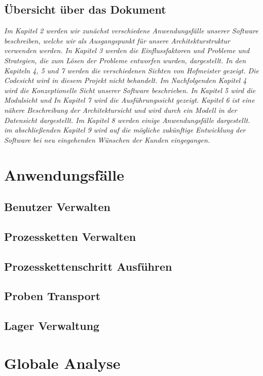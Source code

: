 \documentclass[enabledeprecatedfontcommands,fontsize=12pt,paper=a4,twoside]{scrartcl}
\begin{document}
\subsection{Übersicht über das Dokument}

{ \em Im Kapitel 2 werden wir zunächst verschiedene Anwendungsfälle unserer Software beschreiben, welche wir als Ausgangspunkt für unsere Architekturstruktur verwenden werden. In Kapitel 3 werden die Einflussfaktoren und Probleme und Strategien, die zum Lösen der Probleme entworfen wurden, dargestellt.
In den Kapiteln 4, 5 und 7 werden die verschiedenen Sichten von Hofmeister gezeigt. Die Codesicht wird in diesem Projekt nicht behandelt.
Im Nachfolgenden Kapitel 4 wird die Konzeptionelle Sicht unserer Software beschrieben. In Kapitel 5 wird die Modulsicht und In Kapitel 7 wird die Ausführungssicht gezeigt. Kapitel 6 ist eine nähere Beschreibung der Architektursicht und wird durch ein Modell in der Datensicht dargestellt.
Im Kapitel 8 werden einige Anwendungsfälle dargestellt. im abschließenden Kapitel 9 wird auf die mögliche zukünftige Entwicklung der Software bei neu eingehenden Wünschen der Kunden eingegangen.

}



\section{Anwendungsfälle}
\subsection{Benutzer Verwalten}
\subsection{Prozessketten Verwalten}
\subsection{Prozesskettenschritt Ausführen}
\subsection{Proben Transport}
\subsection{Lager Verwaltung}
\section{Globale Analyse}
\end{document}
